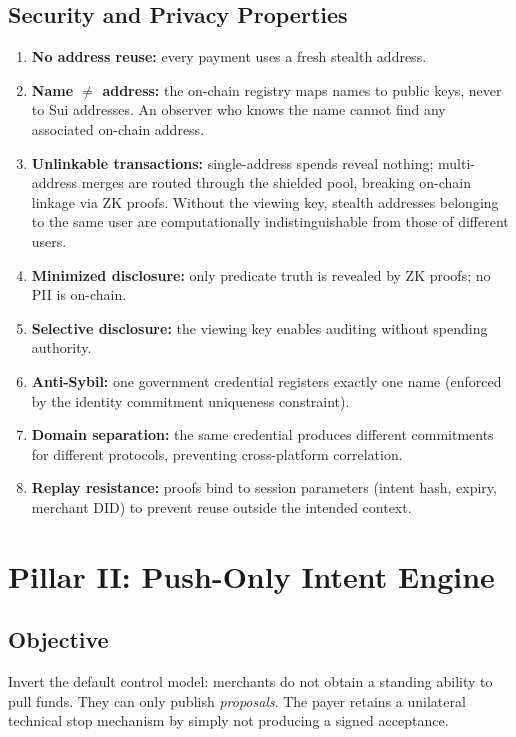 \documentclass[11pt]{article}
\begin{document}
\subsection{Security and Privacy Properties}
\begin{enumerate}
  \item \textbf{No address reuse:} every payment uses a fresh stealth address.
  \item \textbf{Name $\neq$ address:} the on-chain registry maps names to public keys, never to Sui addresses. An observer who knows the name cannot find any associated on-chain address.
  \item \textbf{Unlinkable transactions:} single-address spends reveal nothing; multi-address merges are routed through the shielded pool, breaking on-chain linkage via ZK proofs. Without the viewing key, stealth addresses belonging to the same user are computationally indistinguishable from those of different users.
  \item \textbf{Minimized disclosure:} only predicate truth is revealed by ZK proofs; no PII is on-chain.
  \item \textbf{Selective disclosure:} the viewing key enables auditing without spending authority.
  \item \textbf{Anti-Sybil:} one government credential registers exactly one name (enforced by the identity commitment uniqueness constraint).
  \item \textbf{Domain separation:} the same credential produces different commitments for different protocols, preventing cross-platform correlation.
  \item \textbf{Replay resistance:} proofs bind to session parameters (intent hash, expiry, merchant DID) to prevent reuse outside the intended context.
\end{enumerate}

\section{Pillar II: Push-Only Intent Engine}
\subsection{Objective}
Invert the default control model: merchants do not obtain a standing ability to pull funds. They can only publish \emph{proposals}. The payer retains a unilateral technical stop mechanism by simply not producing a signed acceptance.
\end{document}

